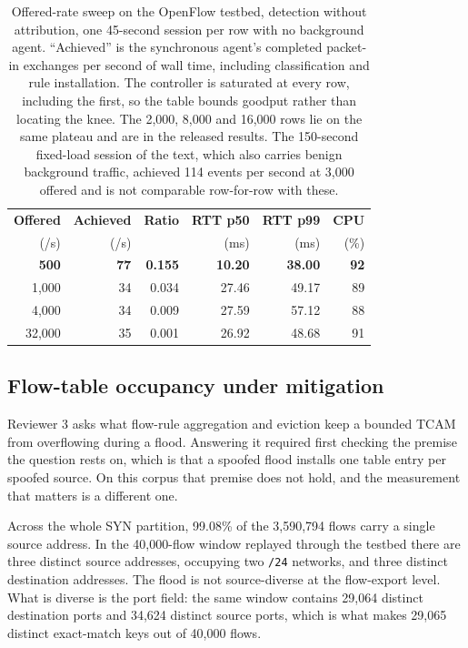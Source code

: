 \documentclass{ieeeaccess}
\begin{document}
\begin{table}[!t]
\caption{Offered-rate sweep on the OpenFlow testbed, detection without
attribution, one 45-second session per row with no background agent.
``Achieved'' is the synchronous agent's completed packet-in exchanges per second
of wall time, including classification and rule installation. The controller is
saturated at every row, including the first, so the table bounds goodput rather
than locating the knee. The 2,000, 8,000 and 16,000 rows lie on the same plateau
and are in the released results. The 150-second fixed-load session of the text,
which also carries benign background traffic, achieved 114 events per second at
3,000 offered and is not comparable row-for-row with these.}
\centering
\label{tab:saturation}
\footnotesize
\setlength{\tabcolsep}{4pt}
\renewcommand{\arraystretch}{1.15}
\begin{tabular}{@{}rrrrrr@{}}
\toprule
\textbf{Offered} & \textbf{Achieved} & \textbf{Ratio} &
\textbf{RTT p50} & \textbf{RTT p99} & \textbf{CPU} \\
(/s) & (/s) & & (ms) & (ms) & (\%) \\
\midrule
\textbf{500}  & \textbf{77} & \textbf{0.155} & \textbf{10.20} & \textbf{38.00} & \textbf{92} \\
1,000  & 34 & 0.034 & 27.46 & 49.17 & 89 \\
4,000  & 34 & 0.009 & 27.59 & 57.12 & 88 \\
32,000 & 35 & 0.001 & 26.92 & 48.68 & 91 \\
\bottomrule
\end{tabular}
\end{table}

\subsection{Flow-table occupancy under mitigation}
\label{sec:flowtable}
Reviewer 3 asks what flow-rule aggregation and eviction keep a bounded TCAM from
overflowing during a flood. Answering it required first checking the premise the
question rests on, which is that a spoofed flood installs one table entry per
spoofed source. On this corpus that premise does not hold, and the measurement
that matters is a different one.

Across the whole SYN partition, 99.08\% of the 3,590,794 flows carry a single
source address. In the 40,000-flow window replayed through the testbed there are
three distinct source addresses, occupying two \texttt{/24} networks, and three
distinct destination addresses. The flood is not source-diverse at the
flow-export level. What is diverse is the port field: the same window contains
29,064 distinct destination ports and 34,624 distinct source ports, which is
what makes 29,065 distinct exact-match keys out of 40,000 flows.
\end{document}
